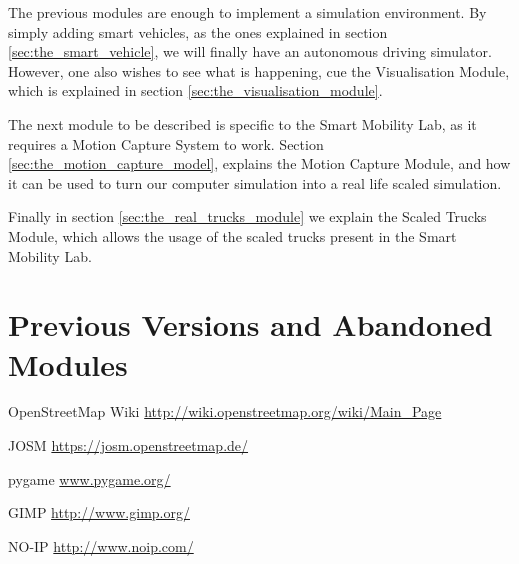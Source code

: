 \documentclass[10pt,a4paper]{article}
\begin{document}
The previous modules are enough to implement a simulation environment. By simply adding smart vehicles, as the ones explained in section \ref{sec:the_smart_vehicle}, we will finally have an autonomous driving simulator. However, one also wishes to see what is happening, cue the Visualisation Module, which is explained in section \ref{sec:the_visualisation_module}.

The next module to be described is specific to the Smart Mobility Lab, as it requires a Motion Capture System to work. Section \ref{sec:the_motion_capture_model}, explains the Motion Capture Module, and how it can be used to turn our computer simulation into a real life scaled simulation.

Finally in section \ref{sec:the_real_trucks_module} we explain the Scaled Trucks Module, which allows the usage of the scaled trucks present in the Smart Mobility Lab.





















\section{Previous Versions and Abandoned Modules}

\begin{thebibliography}{9}

OpenStreetMap Wiki \url{http://wiki.openstreetmap.org/wiki/Main_Page}

JOSM \url{https://josm.openstreetmap.de/}

pygame \url{www.pygame.org/}

GIMP \url{http://www.gimp.org/}

NO-IP \url{http://www.noip.com/}


\end{thebibliography}
\end{document}
